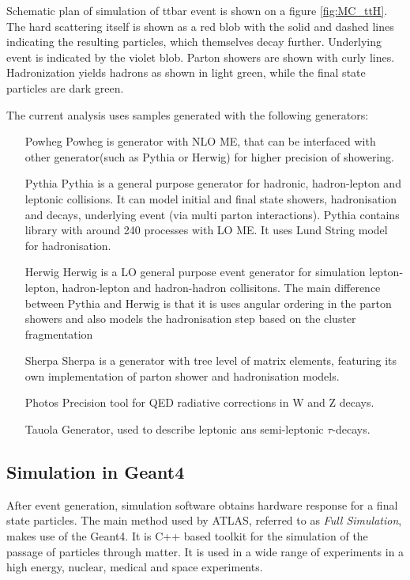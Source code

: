 Schematic plan of simulation of ttbar event is shown on a figure \ref{fig:MC_ttH}. The hard scattering itself is shown as a red blob with the solid and dashed lines indicating the resulting particles, which themselves decay further. 
Underlying event is indicated by the violet blob. 
Parton showers are shown with curly lines.
Hadronization yields hadrons as shown in light green, while the final state particles are dark green.

The current analysis uses samples generated with the following generators:
\begin{itemize}[align=left]
\item[Powheg]Powheg is generator with NLO ME, that can be interfaced with other generator(such as Pythia or Herwig) for higher precision of showering.
\item[Pythia] Pythia is a general purpose generator for hadronic, hadron-lepton and leptonic collisions. It can model initial and final state showers, hadronisation and decays, underlying event (via multi parton interactions). Pythia contains library with around 240 processes with LO ME. It uses Lund String model for hadronisation.
\item[Herwig] Herwig is a LO general purpose event generator for simulation lepton-lepton, hadron-lepton and hadron-hadron collisitons. The main difference between Pythia and Herwig is that it is uses angular ordering in the parton showers and also models the hadronisation step based on the cluster fragmentation
\item[Sherpa] Sherpa is a generator with tree level of matrix elements, featuring its own implementation of parton shower and hadronisation models.
\item[Photos] Precision tool for QED radiative corrections in W and Z decays.
\item[Tauola] Generator, used to describe leptonic ans semi-leptonic $\tau$-decays.
\end{itemize}

\subsection{Simulation in Geant4}

After event generation, simulation software obtains hardware response for a final state particles. The main method used by ATLAS, referred to as \textit{Full Simulation}, makes use of the Geant4\cite{Geant4}. It is C++ based toolkit for the simulation of the passage of particles through matter. It is used in a wide range of experiments in a high energy, nuclear, medical and space experiments.


